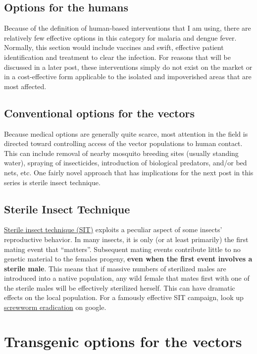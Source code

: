 \subsection{Options for the humans}

Because of the definition of human-based interventions that I am using, there are relatively few effective options in this category for malaria and dengue fever.
Normally, this section would include vaccines and swift, effective patient identification and treatment to clear the infection.
\alert{For reasons that will be discussed in a later post, these interventions simply do not exist on the market or in a cost-effective form applicable to the isolated and impoverished areas that are most affected.}

\subsection{Conventional options for the vectors}

Because medical options are generally quite scarce, most attention in the field is directed toward controlling access of the vector populations to human contact.
This can include removal of nearby mosquito breeding sites (usually standing water), spraying of insecticides, introduction of biological predators, and/or bed nets, etc.
One fairly novel approach that has implications for the next post in this series is sterile insect technique.



\subsection{Sterile Insect Technique}
\href{http://en.wikipedia.org/wiki/Sterile\_insect\_technique}{Sterile insect technique (SIT)} exploits a peculiar aspect of some insects' reproductive behavior. 
In many insects, it is only (or at least
primarily) the first mating event that ``matters''.
Subsequent mating events contribute little to no genetic material to the females progeny, \textbf{even when the first event involves a sterile male}.
This means that if massive numbers of sterilized males are introduced into a native population, any wild female that mates first with one of the sterile males will be effectively sterilized herself.
This can have dramatic effects on the local population.
For a famously effective SIT campaign, look up \href{http://goo.gl/DF7bv}{screwworm eradication} on google.


\section{Transgenic options for the vectors}

